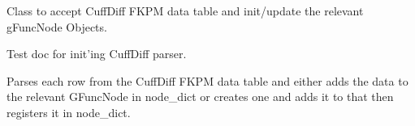 \documentclass[letterpaper,10pt,english]{sphinxmanual}
\begin{document}
\begin{fulllineitems}
\label{code:gfunc.parsers.Cufflinks.CDiffFpkmTrackerParser}
Class to accept CuffDiff FKPM data table and init/update the relevant gFuncNode Objects.

\begin{fulllineitems}
\label{code:gfunc.parsers.Cufflinks.CDiffFpkmTrackerParser.__init__}
Test doc for init'ing CuffDiff parser.

\end{fulllineitems}


\begin{fulllineitems}
\label{code:gfunc.parsers.Cufflinks.CDiffFpkmTrackerParser.resgister_nodes_and_edges}
Parses each row from the CuffDiff FKPM data table and either adds the data to the relevant
GFuncNode in node\_dict or creates one and adds it to that then registers it in node\_dict.

\end{fulllineitems}


\end{fulllineitems}

\end{document}

